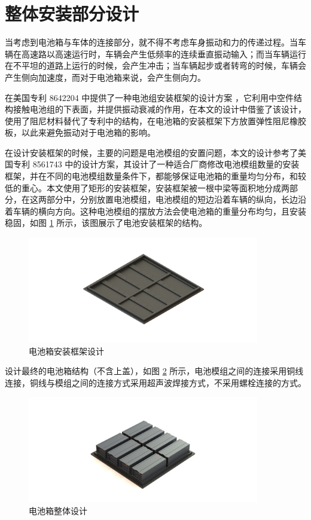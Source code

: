 \section{整体安装部分设计}
当考虑到电池箱与车体的连接部分，就不得不考虑车身振动和力的传递过程。当车辆在高速路以高速运行时，车辆会产生低频率的连续垂直振动输入；而当车辆运行在不平坦的道路上运行的时候，会产生冲击；当车辆起步或者转弯的时候，车辆会产生侧向加速度，而对于电池箱来说，会产生侧向力。

在美国专利 8642204 中提供了一种电池组安装框架的设计方案 \cite{BatteryManagementSystemUsedinElectricVehicles}，它利用中空件结构接触电池组的下表面，并提供振动衰减的作用，在本文的设计中借鉴了该设计，使用了阻尼材料替代了专利中的结构，在电池箱的安装框架下方放置弹性阻尼橡胶板，以此来避免振动对于电池箱的影响。

在设计安装框架的时候，主要的问题是电池模组的安置问题，本文的设计参考了美国专利 8561743 中的设计方案，其设计了一种适合厂商修改电池模组数量的安装框架，并在不同的电池模组数量条件下，都能够保证电池箱的重量均匀分布，和较低的重心。本文使用了矩形的安装框架，安装框架被一根中梁等面积地分成两部分，在这两部分中，分别放置电池模组，电池模组的短边沿着车辆的纵向，长边沿着车辆的横向方向。这种电池模组的摆放方法会使电池箱的重量分布均匀，且安装稳固，如图 \ref{fig:Tray} 所示，该图展示了电池安装框架的结构。

\begin{figure}
	\centering
	\includegraphics[width=0.9\textwidth]{figures/Tray.jpg}
	\caption{电池箱安装框架设计}\label{fig:Tray}
\end{figure}

设计最终的电池箱结构（不含上盖），如图 \ref{fig:Box} 所示，电池模组之间的连接采用铜线连接，铜线与模组之间的连接方式采用超声波焊接方式，不采用螺栓连接的方式。

\begin{figure}
	\centering
	\includegraphics[width=0.9\textwidth]{figures/Box.jpg}
	\caption{电池箱整体设计}\label{fig:Box}
\end{figure}

